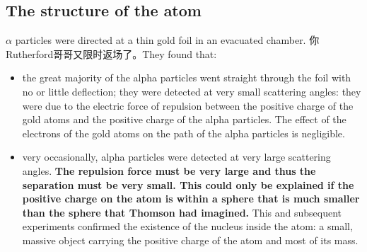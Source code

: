 \documentclass[a4paper,12pt]{article}
\begin{document}
\subsection{The structure of the atom}
$\alpha$ particles were directed at a thin gold foil in an evacuated chamber. 你Rutherford哥哥又限时返场了。They found that:
\begin{itemize}
  \item the great majority of the alpha particles went straight through the foil with no or little deflection; they were detected at very small scattering angles: they were due to the electric force of repulsion between the positive charge of the gold atoms and the positive charge of the alpha particles. The effect of the electrons of the gold atoms on the path of the alpha particles is negligible.
  \item very occasionally, alpha particles were detected at very large scattering angles. \textbf{The repulsion force must be very large and thus the separation must be very small. This could only be explained if the positive charge on the atom is within a sphere that is much smaller than the sphere that Thomson had imagined.} This and subsequent experiments confirmed the existence of the nucleus inside the atom: a small, massive object carrying the positive charge of the atom and most of its mass.
\end{itemize}
\end{document}
